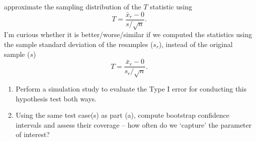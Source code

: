 \documentclass{article}\usepackage[]{graphicx}\usepackage[]{xcolor}
\begin{document}
\begin{enumerate}
approximate the sampling distribution of the $T$ statistic using
\[T = \frac{\bar{x}_r - 0}{s/\sqrt{n}}.\]
I'm curious whether it is better/worse/similar if we computed the statistics
using the sample standard deviation of the resamples ($s_r$), instead of the 
original sample ($s$)
  \[T = \frac{\bar{x}_r - 0}{s_r/\sqrt{n}}.\]
\begin{enumerate}
  \item Perform a simulation study to evaluate the Type I error for conducting this
hypothesis test both ways.
  \item Using the same test case(s) as part (a), compute bootstrap confidence 
  intervals and assess their coverage -- how often do we `capture' the parameter
of interest?
\end{enumerate}
\end{enumerate}

\end{document}
